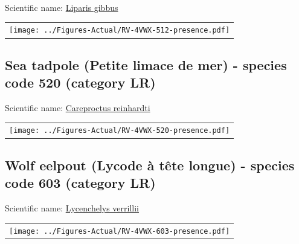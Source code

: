 \documentclass[12pt]{article}\usepackage[]{graphicx}\usepackage[]{color}
\begin{document}
Scientific name: \href{http://www.marinespecies.org/aphia.php?p=taxdetails\&id=159526}{Liparis gibbus} \newline
\begin{minipage}{1.0\textwidth}
 \begin{tabular}{c}
\texttt{[image: ../Figures-Actual/RV-4VWX-512-presence.pdf]} \\ 
\end{tabular} 
\end{minipage}
\clearpage

\renewcommand\thefigure{\thesubsection\Alph{figure}}

\setcounter{figure}{0}

\hypertarget{sec:520}{%
\subsection{Sea tadpole (Petite limace de mer) - species code 520 (category LR)}\label{sec:520}}

  


Scientific name: \href{http://www.marinespecies.org/aphia.php?p=taxdetails\&id=127212}{Careproctus reinhardti} \newline
\begin{minipage}{1.0\textwidth}
 \begin{tabular}{c}
\texttt{[image: ../Figures-Actual/RV-4VWX-520-presence.pdf]} \\ 
\end{tabular} 
\end{minipage}
\clearpage

\renewcommand\thefigure{\thesubsection\Alph{figure}}

\setcounter{figure}{0}

\hypertarget{sec:603}{%
\subsection{Wolf eelpout (Lycode à tête longue) - species code 603 (category LR)}\label{sec:603}}

  


Scientific name: \href{http://www.marinespecies.org/aphia.php?p=taxdetails\&id=159258}{Lycenchelys verrillii} \newline
\begin{minipage}{1.0\textwidth}
 \begin{tabular}{c}
\texttt{[image: ../Figures-Actual/RV-4VWX-603-presence.pdf]} \\ 
\end{tabular} 
\end{minipage}
\clearpage
\end{document}
